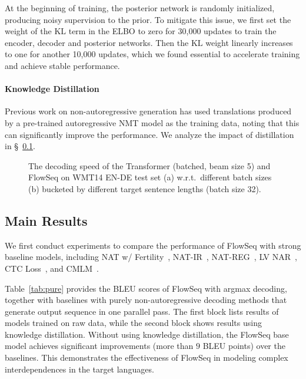 \documentclass[11pt,a4paper]{article}
\begin{document}
At the beginning of training, the posterior network is randomly initialized, producing noisy supervision to the prior.
To mitigate this issue, we first set the weight of the $\mathrm{KL}$ term in the ELBO to zero for 30,000 updates to train the encoder, decoder and posterior networks.
Then the $\mathrm{KL}$ weight linearly increases to one for another 10,000 updates, which we found essential to accelerate training and achieve stable performance.

\paragraph{Knowledge Distillation}
Previous work on non-autoregressive generation \citep{gu2018non,constant2019} has used translations produced by a pre-trained autoregressive NMT model as the training data, noting that this can significantly improve the performance.
We analyze the impact of distillation in \S~\ref{subsec:result}.

\begin{figure*}[t]
  \centering
  \begin{minipage}[t]{1.0\textwidth}
  \end{minipage}
  \caption{The decoding speed of the Transformer (batched, beam size 5) and FlowSeq on WMT14 EN-DE test set (a) w.r.t.~different batch sizes (b) bucketed by different target sentence lengths (batch size 32).}
  \label{fig:speed}
  \vspace{-4mm}
\end{figure*}

\subsection{Main Results}\label{subsec:result}
We first conduct experiments to compare the performance of FlowSeq with strong baseline models, including NAT w/ Fertility~\cite{gu2018non}, NAT-IR~\cite{lee2018deterministic}, NAT-REG~\cite{wang2019non}, LV NAR~\cite{shu2019latent}, CTC Loss~\cite{libovicky2018end}, and CMLM~\cite{constant2019}.

Table~\ref{tab:pure} provides the BLEU scores of FlowSeq with argmax decoding, together with baselines with purely non-autoregressive decoding methods that generate output sequence in one parallel pass.
The first block lists results of models trained on raw data, while the second block shows results using knowledge distillation.
Without using knowledge distillation, the FlowSeq base model achieves significant improvements (more than $9$ BLEU points) over the baselines.
This demonstrates the effectiveness of FlowSeq in modeling complex interdependences in the target languages.
\end{document}
